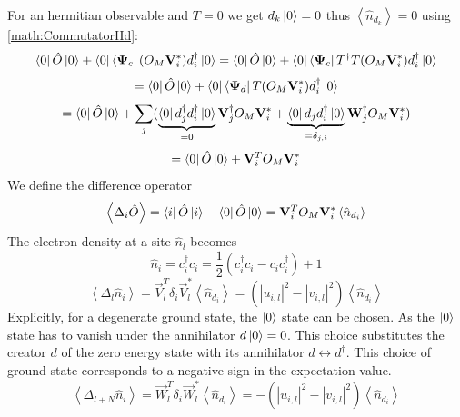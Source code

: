 \documentclass[Master]{subfiles}
\begin{document}
For an hermitian observable and $T =0$ we get $d_k\ket{0}=0$ thus $\left<\hat{n}_{d_k}\right>=0$ using  \eqref{math:CommutatorHd}:
$$
\bra{0} \hat{O} \ket{0}  +  \bra{0}\bra{\mathbf{\Psi}_c}(O_M \mathbf{V}_i^*)d^{\dag}_i\ket{0} = \bra{0} \hat{O} \ket{0}  +   \bra{0}\bra{\mathbf{\Psi}_c} T^{\dag} T 
(O_M \mathbf{V}_i^*)d^{\dag}_i\ket{0} 
$$
$$
= \bra{0} \hat{O} \ket{0}  + \bra{0} \bra{\mathbf{\Psi}_d} T(O_M \mathbf{V}_i^*) d^{\dag}_i\ket{0}$$
$$
= \bra{0} \hat{O} \ket{0}  + \sum_j ( \underbrace{\bra{0}d^{\dag}_{j}d^{\dag}_{i}\ket{0}}_{=0} \mathbf{V}^{\dag}_j O_M \mathbf{V}^*_i+ \underbrace{\bra{0}d_{j}d^{\dag}_{i}\ket{0}}_{= \delta_{j,i}}\mathbf{W}^{\dag}_j O_M \mathbf{V}^*_i) 
$$
$$= \bra{0} \hat{O} \ket{0}  + \mathbf{V}^T_i O_M \mathbf{V}^*_i 
$$
We define the difference operator 
\begin{equation}
\label{bdg:Diffop}
 \left<\Delta_{i}\hat{O}\right> = \bra{i}\hat{O}\ket{i}-\bra{0}\hat{O}\ket{0} =  \mathbf{V}^T_i O_M \mathbf{V}^*_i \left< \hat{n}_{d_i}\right>
\end{equation}
The electron density at a site $\hat{n}_l$ becomes
 $$ \hat{n}_i = c^{\dag}_i c_i = \frac{1}{2}\left( c^{\dag}_i c_i - c_i c^{\dag}_i\right) + 1$$
 $$
 \left<\Delta_{l} \hat{n}_i\right> = \vec{V}^T_l \delta_i \vec{V}^*_l \left< \hat{n}_{d_i}\right> = (|u_{i,l}|^2-|v_{i,l}|^2) \left< \hat{n}_{d_i}\right>
 $$
 Explicitly, for a degenerate ground state, the $\ket{0}$ state can be chosen. As the $\ket{0}$ state has to vanish under the annihilator $d\ket{0} = 0$. 
This choice substitutes the creator $d$ of the zero energy state with its annihilator $d\leftrightarrow d^{\dag}$. This choice of ground state corresponds to a negative-sign in the expectation value. 
\begin{equation}\label{bdg:DiffDens}
 \left<\Delta_{l+N} \hat{n}_i\right> = \vec{W}^T_l \delta_i \vec{W}^*_l \left< \hat{n}_{d_i}\right> = - (|u_{i,l}|^2-|v_{i,l}|^2) \left< \hat{n}_{d_i}\right>
\end{equation}
 
\end{document}
